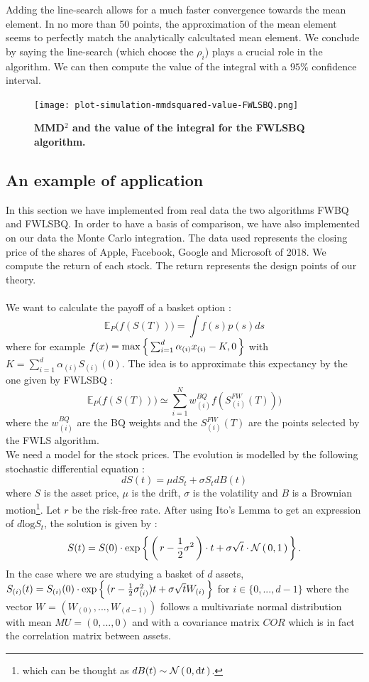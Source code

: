Adding the line-search allows for a much faster convergence towards the mean element. In no more than 50 points, the approximation of the mean element seems to perfectly match the analytically calcultated mean element. We conclude by saying the line-search (which choose the $\rho_{i}$) plays a crucial role in the algorithm.
We can then compute the value of the integral with a $95\%$ confidence interval.
\begin{figure}[H]
\begin{center}
	\texttt{[image: plot-simulation-mmdsquared-value-FWLSBQ.png]}
	\caption{\textbf{MMD$^2$ and the value of the integral for the FWLSBQ algorithm.}}
\end{center}
\end{figure}

\subsection{An example of application}
In this section we have implemented from real data the two algorithms FWBQ and FWLSBQ. In order to have a basis of comparison, we have also implemented on our data the Monte Carlo integration. The data used represents the closing price of the shares of Apple, Facebook, Google and Microsoft of 2018. We compute the return of each stock. The return represents the design points of our theory. \\ \\
We want to calculate the payoff of a basket option : $$ \mathbb{E}_P \Big( f(S(T)) \Big) = \int f(s) p(s) ds $$ where for example $f(x) = \max \left \{ \,  \sum_{i = 1}^{d} \alpha_{(i)} x_{(i)} - K, 0 \, \right \} $ with $K = \sum_{i = 1}^{d} \alpha_{(i)} S_{(i)}(0) $. The idea is to approximate this expectancy by the one given by FWLSBQ : $$ \mathbb{E}_P \Big( f(S(T)) \Big) \simeq \sum_{i = 1}^{N} w_{(i)}^{BQ} f(S_{(i)}^{FW}(T))) $$ where the $w_{(i)}^{BQ}$ are the BQ weights and the $S_{(i)}^{FW}(T)$ are the points selected by the FWLS algorithm. \\
We need a model for the stock prices. The evolution is modelled by the following stochastic differential equation : $$ dS(t) = \mu dS_t + \sigma S_t dB(t) $$ where $S$ is the asset price, $\mu$ is the drift, $\sigma$ is the volatility and $B$ is a Brownian motion\footnote{which can be thought as $dB(t) \sim \mathcal{N}\left( \, 0, \mathop{}\mathopen{}\mathrm{d}{}t \, \right)$.}. Let $r$ be the risk-free rate. After using Ito's Lemma to get an expression of $d\text{log}S_t$, the solution is given by : $$S(t) = S(0) \cdot \exp \left \{ \, \left( \, r-\frac{1}{2}\sigma^2 \, \right)\cdot t + \sigma \sqrt{t} \cdot \mathcal{N}\left( \, 0, 1 \, \right)  \, \right \}.$$ In the case where we are studying a basket of $d$ assets, $S_{(i)}(t) = S_{(i)}(0) \cdot \exp \left \{ \, (r-\frac{1}{2}\sigma_{(i)}^2)t + \sigma \sqrt{t} W_{(i)}  \, \right \}$ for $i \in \{0, ..., d-1\}$ where the vector $W$ = $(W_{(0)}, ..., W_{(d-1)})$ follows a multivariate normal distribution with mean $MU = (0, ..., 0)$ and with a covariance matrix $COR$ which is in fact the correlation matrix between assets. \\
